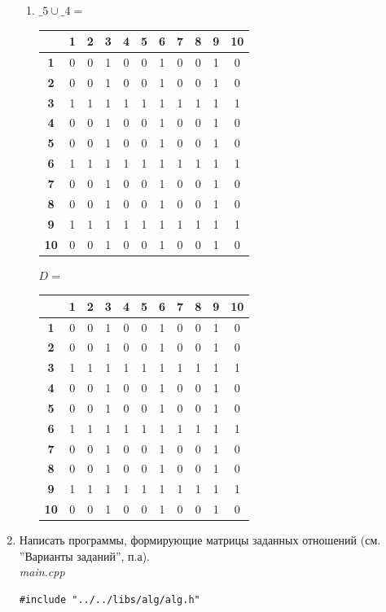 \documentclass[a4paper,14pt]{extarticle}
\begin{document}
\begin{enumerate}[label=1.\arabic*.]
\begin{enumerate}[1) ]
\item $\_5 \cup \_4 = $  \begin{tabular}{|c|c|c|c|c|c|c|c|c|c|c|}
	\hline
	&\textbf{1}&\textbf{2}&\textbf{3}&\textbf{4}&\textbf{5}&\textbf{6}&\textbf{7}&\textbf{8}&\textbf{9}&\textbf{10}\\
	\hline\textbf{1}&0&0&1&0&0&1&0&0&1&0\\
	\hline\textbf{2}&0&0&1&0&0&1&0&0&1&0\\
	\hline\textbf{3}&1&1&1&1&1&1&1&1&1&1\\
	\hline\textbf{4}&0&0&1&0&0&1&0&0&1&0\\
	\hline\textbf{5}&0&0&1&0&0&1&0&0&1&0\\
	\hline\textbf{6}&1&1&1&1&1&1&1&1&1&1\\
	\hline\textbf{7}&0&0&1&0&0&1&0&0&1&0\\
	\hline\textbf{8}&0&0&1&0&0&1&0&0&1&0\\
	\hline\textbf{9}&1&1&1&1&1&1&1&1&1&1\\
	\hline\textbf{10}&0&0&1&0&0&1&0&0&1&0\\
	\hline
\end{tabular}\bigbreak
$D = $ \begin{tabular}{|c|c|c|c|c|c|c|c|c|c|c|}
	\hline
	&\textbf{1}&\textbf{2}&\textbf{3}&\textbf{4}&\textbf{5}&\textbf{6}&\textbf{7}&\textbf{8}&\textbf{9}&\textbf{10}\\
	\hline\textbf{1}&0&0&1&0&0&1&0&0&1&0\\
	\hline\textbf{2}&0&0&1&0&0&1&0&0&1&0\\
	\hline\textbf{3}&1&1&1&1&1&1&1&1&1&1\\
	\hline\textbf{4}&0&0&1&0&0&1&0&0&1&0\\
	\hline\textbf{5}&0&0&1&0&0&1&0&0&1&0\\
	\hline\textbf{6}&1&1&1&1&1&1&1&1&1&1\\
	\hline\textbf{7}&0&0&1&0&0&1&0&0&1&0\\
	\hline\textbf{8}&0&0&1&0&0&1&0&0&1&0\\
	\hline\textbf{9}&1&1&1&1&1&1&1&1&1&1\\
	\hline\textbf{10}&0&0&1&0&0&1&0&0&1&0\\
	\hline
\end{tabular}
\end{enumerate}
    \item Написать программы, формирующие матрицы заданных отношений (см. ”Варианты заданий”, п.а).\\
    \textit{main.cpp}
    \begin{verbatim}
#include "../../libs/alg/alg.h"


\end{verbatim}
\end{enumerate}
\end{document}
